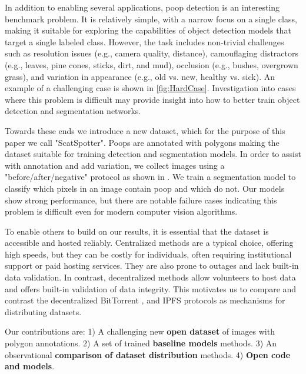 \documentclass[10pt,twocolumn,letterpaper]{article}
\begin{document}
In addition to enabling several applications, poop detection is an interesting benchmark problem.
It is relatively simple, with a narrow focus on a single class, making it suitable for exploring the
  capabilities of object detection models that target a single labeled class.
However, the task includes non-trivial challenges such as resolution issues (e.g., camera quality,
  distance), camouflaging distractors (e.g., leaves, pine cones, sticks, dirt, and mud), occlusion (e.g., bushes, overgrown
  grass), and variation in appearance (e.g., old vs. new, healthy vs. sick).
An example of a challenging case is shown in \cref{fig:HardCase}.
Investigation into cases where this problem is difficult may provide insight
into how to better train object detection and segmentation networks.

Towards these ends we introduce a new dataset, which for the purpose of this paper we call "ScatSpotter".
Poops are annotated with polygons making the dataset suitable for training detection and segmentation
  models.
In order to assist with annotation and add variation, we collect images using a "before/after/negative"
  protocol as shown in .
We train a segmentation model to classify which pixels in an image contain poop and which do not.
Our models show strong performance, but there are notable failure cases indicating this problem is difficult
  even for modern computer vision algorithms.

To enable others to build on our results, it is essential that the dataset is accessible and hosted
  reliably.
Centralized methods are a typical choice, offering high speeds, but they can be costly for individuals,
  often requiring institutional support or paid hosting services.
They are also prone to outages and lack built-in data validation.
In contrast, decentralized methods allow volunteers to host data and offers built-in validation of data
  integrity.
This motivates us to compare and contrast the decentralized BitTorrent \cite{cohen_incentives_2003}, and
  IPFS \cite{benet_ipfs_2014} protocols as mechanisms for distributing datasets.


Our contributions are:
1) A challenging new \textbf{open dataset} of images with polygon annotations.
2) A set of trained \textbf{baseline models} methods.
3) An observational \textbf{comparison of dataset distribution} methods.
4) \textbf{Open code and models}.
\end{document}
